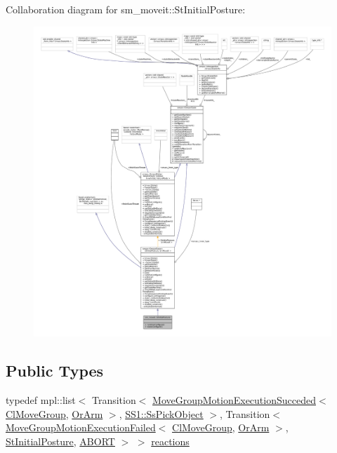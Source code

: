 Collaboration diagram for sm\+\_\+moveit\+:\+:St\+Initial\+Posture\+:
\nopagebreak
\begin{figure}[H]
\begin{center}
\leavevmode
\includegraphics[width=350pt]{structsm__moveit_1_1StInitialPosture__coll__graph}
\end{center}
\end{figure}
\subsection*{Public Types}
\begin{DoxyCompactItemize}
\item 
typedef mpl\+::list$<$ Transition$<$ \hyperlink{structsm__moveit_1_1cl__movegroup_1_1MoveGroupMotionExecutionSucceded}{Move\+Group\+Motion\+Execution\+Succeded}$<$ \hyperlink{classsm__moveit_1_1cl__movegroup_1_1ClMoveGroup}{Cl\+Move\+Group}, \hyperlink{classsm__moveit_1_1OrArm}{Or\+Arm} $>$, \hyperlink{structsm__moveit_1_1SS1_1_1SsPickObject}{S\+S1\+::\+Ss\+Pick\+Object} $>$, Transition$<$ \hyperlink{structsm__moveit_1_1cl__movegroup_1_1MoveGroupMotionExecutionFailed}{Move\+Group\+Motion\+Execution\+Failed}$<$ \hyperlink{classsm__moveit_1_1cl__movegroup_1_1ClMoveGroup}{Cl\+Move\+Group}, \hyperlink{classsm__moveit_1_1OrArm}{Or\+Arm} $>$, \hyperlink{structsm__moveit_1_1StInitialPosture}{St\+Initial\+Posture}, \hyperlink{classABORT}{A\+B\+O\+RT} $>$ $>$ \hyperlink{structsm__moveit_1_1StInitialPosture_a0ca17de7a1f01a6c8e8904efb027f218}{reactions}
\end{DoxyCompactItemize}
